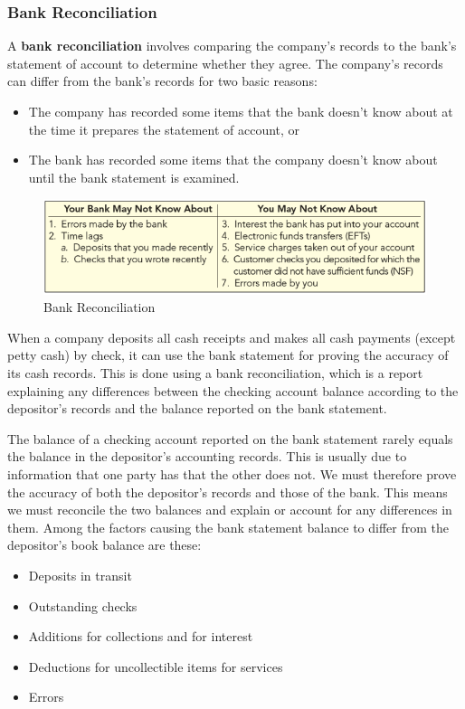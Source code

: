 \documentclass[../main.tex]{subfiles}
\begin{document}
	\subsubsection{Bank Reconciliation}
	
	A \textbf{bank reconciliation} involves comparing the company’s records to 
	the bank’s statement of account to determine whether they agree. The 
	company’s records can differ from the bank’s records for two basic reasons: 
	
	\begin{itemize}[noitemsep]
		\item The company has recorded some items that the bank doesn’t know 
		about at the time it prepares the statement of account, or
		\item The bank has recorded some items that the company doesn’t know 
		about until the bank statement is examined.
	\end{itemize}
	
	\begin{figure}[ht]
		\centering
		\includegraphics[width=1\columnwidth]{images/c5/bank_reconciliation.png}
		\caption{Bank Reconciliation}
	\end{figure}

	When a company deposits all cash receipts and makes all cash payments 
	(except petty cash) by check, it can use the bank statement for proving the 
	accuracy of its cash records. This is done using a bank reconciliation, 
	which is a report explaining any differences between the checking account 
	balance according to the depositor’s records and the balance reported on 
	the bank statement.
	
	The balance of a checking account reported on the bank statement rarely 
	equals the balance in the depositor’s accounting records. This is usually 
	due to information that one party has that the other does not. We must 
	therefore prove the accuracy of both the depositor’s records and those of 
	the bank. This means we must reconcile the two balances and explain or 
	account for any differences in them. Among the factors causing the bank 
	statement balance to differ from the depositor’s book balance are these:
	\begin{itemize}[noitemsep]
		\item Deposits in transit 
		\item Outstanding checks 
		\item Additions for collections and for interest
		\item Deductions for uncollectible items for services
		\item Errors
	\end{itemize}
	
\end{document}
